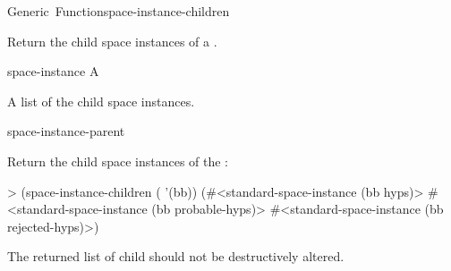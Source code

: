 \documentclass[10pt,twoside,english,pdftex]{article}
\begin{document}

\begin{functiondoc}{Generic~Function}{space-instance-children}%
  {
    \returns{} }
%

\fnsyntax

\fnpurpose Return the child space instances of a .

\fnmethods
{}%
  {\code{(} 
    \returns{} }

\fnpackage {}

\fnmodule {}

\fnargs
\begin{args}{space-instance}
 A 
\end{args}

\fnreturns A list of the child space instances.

\begin{alsos}{space-instance-parent}
\end{alsos}

\fnexample
{}%
Return the child space instances  of the  :
\begin{example}
> (space-instance-children ( '(bb))
(#<standard-space-instance (bb hyps)>
 #<standard-space-instance (bb probable-hyps)>
 #<standard-space-instance (bb rejected-hyps)>)
\end{example}

\fnnotes The returned list of child  should not be
destructively altered.

\end{functiondoc}

\end{document}
